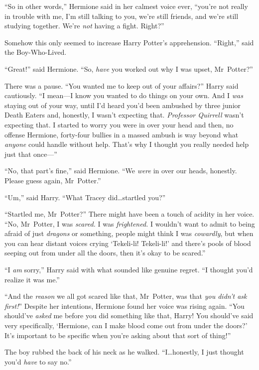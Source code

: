 “So in other words,” Hermione said in her calmest voice ever, “you’re not really in trouble with me, I’m still talking to you, we’re still friends, and we’re still studying together. We’re \emph{not} having a fight. Right?”

Somehow this only seemed to increase Harry Potter’s apprehension. “Right,” said the Boy-Who-Lived.

“Great!” said Hermione. “So, \emph{have} you worked out why I was upset, Mr~Potter?”

There was a pause. “You wanted me to keep out of your affairs?” Harry said cautiously. “I mean—I know you wanted to do things on your own. And I \emph{was} staying out of your way, until I’d heard you’d been ambushed by three junior Death Eaters and, honestly, I wasn’t expecting that. \emph{Professor Quirrell} wasn’t expecting that. I started to worry you were in over your head and then, no offense Hermione, forty-four bullies in a massed ambush is way beyond what \emph{anyone} could handle without help. That’s why I thought you really needed help just that once—”

“No, that part’s fine,” said Hermione. “We \emph{were} in over our heads, honestly. Please guess again, Mr~Potter.”

“Um,” said Harry. “What Tracey did…startled you?”

“Startled me, Mr~Potter?” There might have been a touch of acidity in her voice. “No, Mr~Potter, I was \emph{scared.} I was \emph{frightened.} I wouldn’t want to admit to being afraid of just \emph{dragons} or something, people might think I was \emph{cowardly}, but when you can hear distant voices crying ‘Tekeli-li! Tekeli-li!’ and there’s pools of blood seeping out from under all the doors, then it’s okay to be scared.”

“I \emph{am} sorry,” Harry said with what sounded like genuine regret. “I thought you’d realize it was me.”

“And the \emph{reason} we all got scared like that, Mr~Potter, was that \emph{you didn’t ask first!}” Despite her intentions, Hermione found her voice was rising again. “You should’ve \emph{asked} me before you did something like that, Harry! You should’ve said very specifically, ‘Hermione, can I make blood come out from under the doors?’ It’s important to be specific when you’re asking about that sort of thing!”

The boy rubbed the back of his neck as he walked. “I…honestly, I just thought you’d \emph{have} to say no.”

